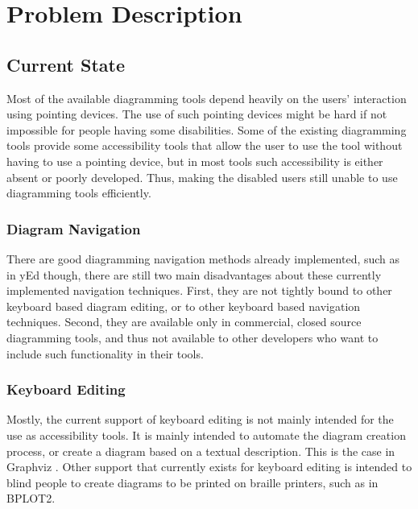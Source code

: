 \chapter{Problem Description}
\beginchapter

\section{Current State}
Most of the available diagramming tools depend heavily on the users' interaction using pointing devices. The use of such pointing devices might be hard if not impossible for people having some disabilities. Some of the existing diagramming tools provide some accessibility tools that allow the user to use the tool without having to use a pointing device, but in most tools such accessibility is either absent or poorly developed. Thus, making the disabled users still unable to use diagramming tools efficiently.

\subsection{Diagram Navigation}
There are good diagramming navigation methods already implemented, such as in yEd \cite{yed} though, there are still two main disadvantages about these currently implemented navigation techniques. First, they are not tightly bound to other keyboard based diagram editing, or to other keyboard based navigation techniques. Second, they are available only in commercial, closed source diagramming tools, and thus not available to other developers who want to include such functionality in their tools.

\subsection{Keyboard Editing}
Mostly, the current support of keyboard editing is not mainly intended for the use as accessibility tools. It is mainly intended to automate the diagram creation process, or create a diagram based on a textual description. This is the case in Graphviz \cite{graphviz}. Other support that currently exists for keyboard editing is intended to blind people to create diagrams to be printed on braille printers, such as in BPLOT2. \cite{bplot2}

